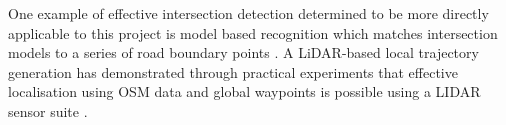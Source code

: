 \documentclass[]{aiaa-tc}%
\begin{document}
One example of effective intersection detection determined to be more directly applicable to this project is model based recognition which matches intersection models to a series of road boundary points \citep{modelBasedIntersection}.
A LiDAR-based local trajectory generation has demonstrated through practical experiments that effective localisation using OSM data and global waypoints is possible using a LIDAR sensor suite \cite{mitLocalNavDriving}. 


%
%
%
%
%
\end{document}
